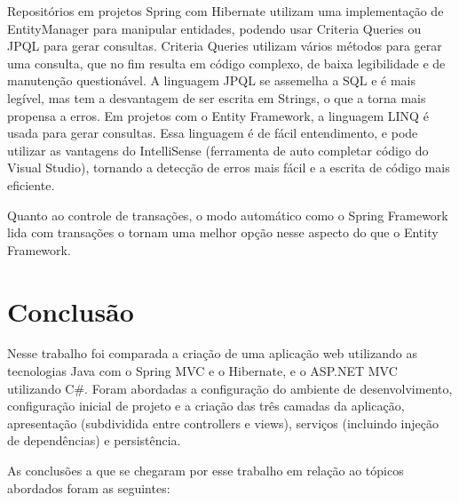 \documentclass[a4paper,12pt]{article}
\begin{document}
Repositórios em projetos Spring com Hibernate utilizam uma implementação de EntityManager para manipular entidades, podendo usar Criteria Queries ou JPQL para gerar consultas. Criteria Queries utilizam vários métodos para gerar uma consulta, que no fim resulta em código complexo, de baixa legibilidade e de manutenção questionável. A linguagem JPQL se assemelha a SQL e é mais legível, mas tem a desvantagem de ser escrita em Strings, o que a torna mais propensa a erros. Em projetos com o Entity Framework, a linguagem LINQ é usada para gerar consultas. Essa linguagem é de fácil entendimento, e pode utilizar as vantagens do IntelliSense (ferramenta de auto completar código do Visual Studio), tornando a detecção de erros mais fácil e a escrita de código mais eficiente.

Quanto ao controle de transações, o modo automático como o Spring Framework lida com transações o tornam uma melhor opção nesse aspecto do que o Entity Framework. 

\newpage
\section{Conclusão}

Nesse trabalho foi comparada a criação de uma aplicação web utilizando as tecnologias Java com o Spring MVC e o Hibernate, e o ASP.NET MVC utilizando C\#. Foram abordadas a configuração do ambiente de desenvolvimento, configuração inicial de projeto e a criação das três camadas da aplicação, apresentação (subdividida entre controllers e views), serviços (incluindo injeção de dependências) e persistência.

As conclusões a que se chegaram por esse trabalho em relação ao tópicos abordados foram as seguintes:
\end{document}
